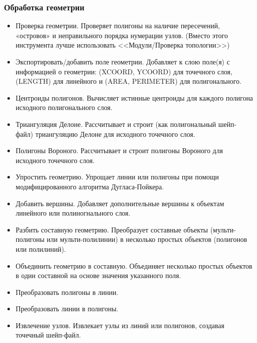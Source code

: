 \begin{frame}[allowframebreaks]
    \frametitle{Обработка геометрии}
    \begin{itemize}
        \item Проверка геометрии. Проверяет полигоны на наличие пересечений, «островов» и неправильного порядка нумерации узлов. (Вместо этого инструмента лучше использовать <<Модули/Проверка топологии>>)
        \item Экспортировать/добавить поле геометрии. Добавляет к слою поле(я) с информацией о геометрии: (XCOORD, YCOORD) для точечного слоя, (LENGTH) для линейного и (AREA, PERIMETER) для полигонального.
        \item Центроиды полигонов. Вычисляет истинные центроиды для каждого полигона исходного полигонального слоя.
        \item Триангуляция Делоне. Рассчитывает и строит (как полигональный шейп-файл) триангуляцию Делоне для исходного точечного слоя.
        \item Полигоны Вороного. Рассчитывает и строит полигоны Вороного для исходного точечного слоя.
        \item Упростить геометрию. Упрощает линии или полигоны при помощи модифицированного алгоритма Дугласа-Пойкера.
        \item Добавить вершины. Добавляет дополнительные вершины к объектам линейного или полиногнального слоя.
        \item Разбить составную геометрию. Преобразует составные объекты (мульти-полигоны или мульти-полилинии) в несколько простых объектов (полигонов или полилиний).
        \item Объединить геометрию в составную. Объединяет несколько простых объектов в один составной на основе значения указанного поля.
        \item Преобразовать полигоны в линии.
        \item Преобразовать линии в полигоны.
        \item Извлечение узлов. Извлекает узлы из линий или полигонов, создавая точечный шейп-файл.
    \end{itemize}

\end{frame}

